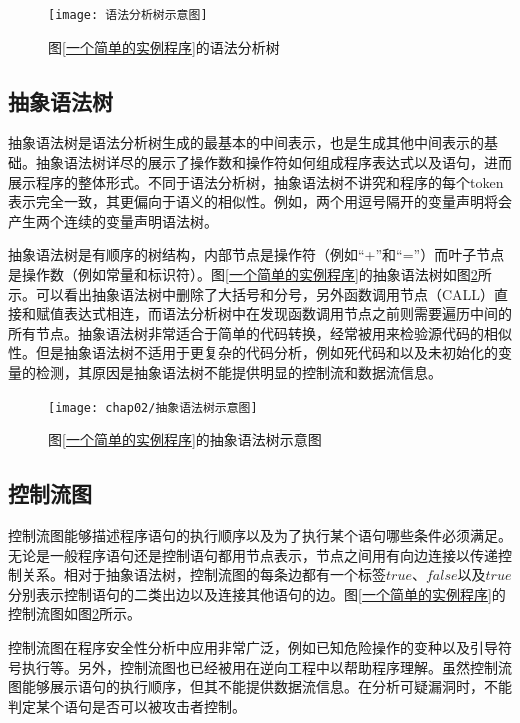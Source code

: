 \begin{figure}[htp]
\centering
\texttt{[image: 语法分析树示意图]}
\caption{图\ref{一个简单的实例程序}的语法分析树}
\label{语法分析树示例}
\end{figure}

\subsection{抽象语法树}

抽象语法树是语法分析树生成的最基本的中间表示，也是生成其他中间表示的基础。抽象语法树详尽的展示了操作数和操作符如何组成程序表达式以及语句，进而展示程序的整体形式。不同于语法分析树，抽象语法树不讲究和程序的每个token表示完全一致，其更偏向于语义的相似性。例如，两个用逗号隔开的变量声明将会产生两个连续的变量声明语法树。

抽象语法树是有顺序的树结构，内部节点是操作符（例如“+”和“=”）而叶子节点是操作数（例如常量和标识符）。图\ref{一个简单的实例程序}的抽象语法树如图\ref{抽象语法树示意图}所示。可以看出抽象语法树中删除了大括号和分号，另外函数调用节点{（CALL）}直接和赋值表达式相连，而语法分析树中在发现函数调用节点之前则需要遍历中间的所有节点。抽象语法树非常适合于简单的代码转换，经常被用来检验源代码的相似性。但是抽象语法树不适用于更复杂的代码分析，例如死代码和以及未初始化的变量的检测，其原因是抽象语法树不能提供明显的控制流和数据流信息。


\begin{figure}[htp]
\centering
\texttt{[image: chap02/抽象语法树示意图]}
\caption{图\ref{一个简单的实例程序}的抽象语法树示意图}
\label{抽象语法树示意图}
\end{figure}

\subsection{控制流图}

控制流图能够描述程序语句的执行顺序以及为了执行某个语句哪些条件必须满足。无论是一般程序语句还是控制语句都用节点表示，节点之间用有向边连接以传递控制关系。相对于抽象语法树，控制流图的每条边都有一个标签$true$、$false$以及$true$分别表示控制语句的二类出边以及连接其他语句的边。图\ref{一个简单的实例程序}的控制流图如图\ref{抽象语法树示意图}所示。

控制流图在程序安全性分析中应用非常广泛，例如已知危险操作的变种以及引导符号执行等。另外，控制流图也已经被用在逆向工程中以帮助程序理解。虽然控制流图能够展示语句的执行顺序，但其不能提供数据流信息。在分析可疑漏洞时，不能判定某个语句是否可以被攻击者控制。

